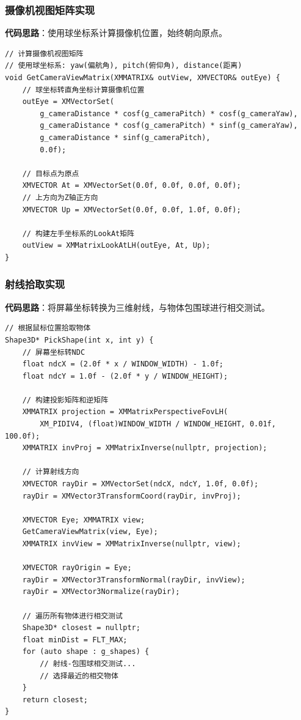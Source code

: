\documentclass[12pt,a4paper]{article}
\begin{document}
\begin{tcolorbox}
\subsubsection{摄像机视图矩阵实现}

\textbf{代码思路}：使用球坐标系计算摄像机位置，始终朝向原点。

\begin{lstlisting}[caption={摄像机视图矩阵计算}]
// 计算摄像机视图矩阵
// 使用球坐标系: yaw(偏航角), pitch(俯仰角), distance(距离)
void GetCameraViewMatrix(XMMATRIX& outView, XMVECTOR& outEye) {
    // 球坐标转直角坐标计算摄像机位置
    outEye = XMVectorSet(
        g_cameraDistance * cosf(g_cameraPitch) * cosf(g_cameraYaw),
        g_cameraDistance * cosf(g_cameraPitch) * sinf(g_cameraYaw),
        g_cameraDistance * sinf(g_cameraPitch), 
        0.0f);
    
    // 目标点为原点
    XMVECTOR At = XMVectorSet(0.0f, 0.0f, 0.0f, 0.0f);
    // 上方向为Z轴正方向
    XMVECTOR Up = XMVectorSet(0.0f, 0.0f, 1.0f, 0.0f);
    
    // 构建左手坐标系的LookAt矩阵
    outView = XMMatrixLookAtLH(outEye, At, Up);
}
\end{lstlisting}

\subsubsection{射线拾取实现}

\textbf{代码思路}：将屏幕坐标转换为三维射线，与物体包围球进行相交测试。

\begin{lstlisting}[caption={射线拾取函数}]
// 根据鼠标位置拾取物体
Shape3D* PickShape(int x, int y) {
    // 屏幕坐标转NDC
    float ndcX = (2.0f * x / WINDOW_WIDTH) - 1.0f;
    float ndcY = 1.0f - (2.0f * y / WINDOW_HEIGHT);
    
    // 构建投影矩阵和逆矩阵
    XMMATRIX projection = XMMatrixPerspectiveFovLH(
        XM_PIDIV4, (float)WINDOW_WIDTH / WINDOW_HEIGHT, 0.01f, 100.0f);
    XMMATRIX invProj = XMMatrixInverse(nullptr, projection);
    
    // 计算射线方向
    XMVECTOR rayDir = XMVectorSet(ndcX, ndcY, 1.0f, 0.0f);
    rayDir = XMVector3TransformCoord(rayDir, invProj);
    
    XMVECTOR Eye; XMMATRIX view;
    GetCameraViewMatrix(view, Eye);
    XMMATRIX invView = XMMatrixInverse(nullptr, view);
    
    XMVECTOR rayOrigin = Eye;
    rayDir = XMVector3TransformNormal(rayDir, invView);
    rayDir = XMVector3Normalize(rayDir);
    
    // 遍历所有物体进行相交测试
    Shape3D* closest = nullptr;
    float minDist = FLT_MAX;
    for (auto shape : g_shapes) {
        // 射线-包围球相交测试...
        // 选择最近的相交物体
    }
    return closest;
}
\end{lstlisting}
\end{tcolorbox}
\end{document}
